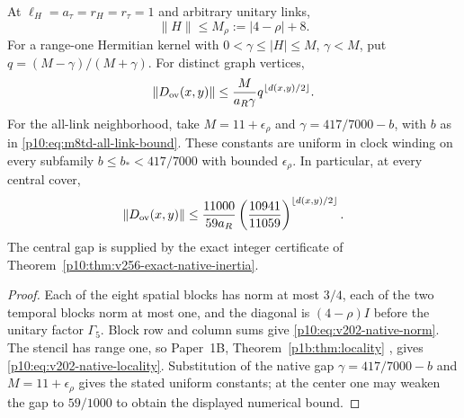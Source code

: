 \documentclass[12pt,a4paper]{article}
\begin{document}
\begin{theorem}
\label{p10:thm:v202-native-overlap-locality}
At $\ell_H=a_\tau=r_H=r_\tau=1$ and arbitrary unitary links,
\begin{equation}
 \|H\|\le M_\rho:=|4-\rho|+8.
 \label{p10:eq:v202-native-norm}
\end{equation}
For a range-one Hermitian kernel with $0<\gamma\le|H|\le M$, $\gamma<M$,
put $q=(M-\gamma)/(M+\gamma)$. For distinct graph vertices,
\begin{equation}
 \|D_{\rm ov}(x,y)\|
 \le\frac{M}{a_R\gamma}q^{\lfloor d(x,y)/2\rfloor}.
 \label{p10:eq:v202-native-locality}
\end{equation}
For the all-link neighborhood, take $M=11+\epsilon_\rho$ and
$\gamma=417/7000-b$, with $b$ as in
\eqref{p10:eq:m8td-all-link-bound}. These constants are uniform in clock
winding on every subfamily $b\le b_*<417/7000$ with bounded
$\epsilon_\rho$. In particular, at every central cover,
\[
 \|D_{\rm ov}(x,y)\|
 \le\frac{11000}{59a_R}
       \left(\frac{10941}{11059}\right)^{\lfloor d(x,y)/2\rfloor}.
\]
The central gap is supplied by the exact integer certificate of
Theorem~\ref{p10:thm:v256-exact-native-inertia}.
\end{theorem}
\begin{proof}
Each of the eight spatial blocks has norm at most $3/4$, each of the
two temporal blocks norm at most one, and the diagonal is $(4-\rho)I$
before the unitary factor $\Gamma_5$. Block row and column sums give
\eqref{p10:eq:v202-native-norm}. The stencil has range one, so
Paper~1B, Theorem~\ref{p1b:thm:locality}
\cite{Kugelmann2026Paper1B}, gives
\eqref{p10:eq:v202-native-locality}. Substitution of the native gap
$\gamma=417/7000-b$ and $M=11+\epsilon_\rho$ gives the stated
uniform constants; at the center one may weaken the gap to $59/1000$
to obtain the displayed numerical bound.
\end{proof}
\end{document}
